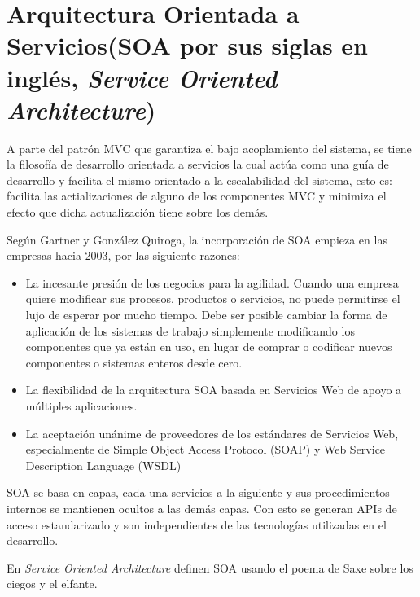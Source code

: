     \section{Arquitectura Orientada a Servicios(SOA por sus siglas en inglés, \textit{Service Oriented Architecture})}
    
    A parte del patrón MVC que garantiza el bajo acoplamiento del sistema, se tiene la filosofía de desarrollo orientada a servicios la cual actúa como una guía de desarrollo y facilita el mismo orientado a la escalabilidad del sistema, esto es: facilita las actializaciones de alguno de los componentes MVC y minimiza el efecto que dicha actualización tiene sobre los demás.
    
    Según Gartner\cite{SOA-libroGartner} y González Quiroga\cite{SOA-tesis}, la incorporación de SOA empieza en las empresas hacia 2003, por las siguiente razones:
    
    \begin{itemize}
        \item La incesante presión de los negocios para la agilidad. Cuando una empresa quiere
        modificar sus procesos, productos o servicios, no puede permitirse el lujo de esperar por
        mucho tiempo. Debe ser posible cambiar la forma de aplicación de los sistemas de
        trabajo simplemente modificando los componentes que ya están en uso, en lugar de
        comprar o codificar nuevos componentes o sistemas enteros desde cero.
        
        \item La flexibilidad de la arquitectura SOA basada en Servicios Web de apoyo a múltiples
        aplicaciones.
        
        \item  La aceptación unánime de proveedores de los estándares de Servicios Web,
        especialmente de Simple Object Access Protocol (SOAP) y Web Service Description
        Language (WSDL)\cite{SOA-libroGartner}
        
    \end{itemize}
    
    SOA se basa en capas, cada una servicios a la siguiente y sus procedimientos internos se mantienen ocultos a las demás capas. Con esto se generan APIs de acceso estandarizado y son independientes de las tecnologías utilizadas en el desarrollo.
    
    En \textit{Service Oriented Architecture}\cite{SOA-msdn} definen SOA usando el poema de Saxe sobre los ciegos y el elfante.
    
